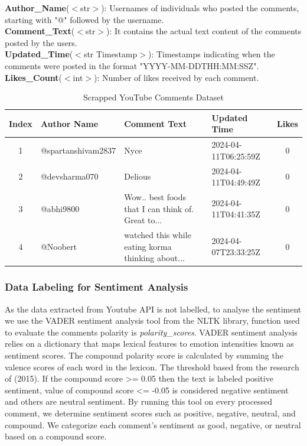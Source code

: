 \documentclass[11pt,article,oneside]{article}
\begin{document}
\textbf{Author\_Name}($<$str$>$): Usernames of individuals who posted the comments, starting with "@" followed by the username. \\
\textbf{Comment\_Text}($<$str$>$): It contains the actual text content of the comments posted by the users. \\
\textbf{Updated\_Time}($<$str Timestamp$>$): Timestamps indicating when the comments were posted in the format "YYYY-MM-DDTHH:MM:SSZ". \\
\textbf{Likes\_Count}($<$int$>$): Number of likes received by each comment.

\begin{table}[h]
\centering
\caption{Scrapped YouTube Comments Dataset}
\label{tab:yt_comments}
\begin{tabular}{cp{2.9cm}p{4.3cm}p{2.3cm}c}
\toprule
\textbf{Index} & \textbf{Author Name} & \textbf{Comment Text} & \textbf{Updated Time} & \textbf{Likes} \\
\midrule
1 & @spartanshivam2837 & Nyce & 2024-04-11T06:25:59Z & 0 \\
2 & @devsharma070 & Delious & 2024-04-11T04:49:49Z & 0 \\
3 & @abhi9800 & Wow.. best foods that I can think of. Great to... & 2024-04-11T04:41:35Z & 0 \\
4 & @Noobert & watched this while eating korma thinking about... & 2024-04-07T23:33:25Z & 0 \\
\bottomrule
\end{tabular}
\end{table}

\subsubsection{Data Labeling for Sentiment Analysis}
As the data extracted from Youtube API is not labelled, to analyse the sentiment we use the VADER\citep{vaderUsage} sentiment analysis tool from the NLTK library, function used to evaluate the comments polarity is \emph{polarity\_scores}. VADER  sentiment  analysis  relies  on  a  dictionary  that  maps  lexical  features  to emotion  intensities known  as  sentiment scores. The compound polarity score is calculated  by summing the valence scores of each word in the lexicon. The threshold based from the research of \citet{Hutto}(2015). If the compound score >= 0.05 then the text is labeled positive sentiment, value of compound score <= -0.05 is considered negative sentiment and others are neutral sentiment. By running this tool on every processed comment, we determine sentiment scores such as positive, negative, neutral, and compound. We categorize each comment's sentiment as good, negative, or neutral based on a compound score.
\end{document}
